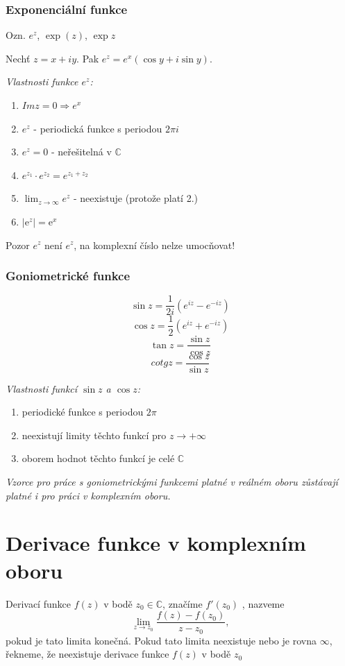 \subsubsection{Exponenciální funkce}
Ozn. $e^z$, $\exp(z)$, $\exp z$
\begin{definition}
Nechť $z=x+iy$. Pak $e^z=e^x(\cos y +i\sin y)$.
\end{definition}

\textit{Vlastnosti funkce $e^z$:} 
\begin{enumerate}
\item $Im z= 0 \Rightarrow e^x$
\item $e^z$ - periodická funkce s periodou $2\pi i$
\item $e^z=0$ - neřešitelná v $\mathbb{C}$
\item $e^{z_1}\cdot e^{z_2}=e^{z_1+z_2}$
\item $\lim_{z \to \infty}e^z$ - neexistuje (protože platí 2.)
\item $|\mathrm{e}^{z}|=\mathrm{e}^x$ 
\end{enumerate}

Pozor $e^z$ není $e^z$, na komplexní číslo nelze umocňovat!

\subsubsection{Goniometrické funkce}

$$\sin z = \frac{1}{2i}(e^{iz}-e^{-iz})$$
$$\cos z = \frac{1}{2}(e^{iz}+e^{-iz})$$
$$\tan z = \frac{\sin z}{\cos z}$$
$$cotg z = \frac{\cos z}{\sin z}$$

\textit{Vlastnosti funkcí $\sin z$ a $\cos z$:} 
\begin{enumerate}
\item periodické funkce s periodou $2\pi$
\item neexistují limity těchto funkcí pro $z\rightarrow +\infty$
\item oborem hodnot těchto funkcí je celé $\mathbb{C}$
\end{enumerate}

\textit{Vzorce pro práce s goniometrickými funkcemi platné v reálném oboru zůstávají platné i pro práci v komplexním oboru.}

\section{Derivace funkce v komplexním oboru} 

\begin{definition}
Derivací funkce $f(z)$ v bodě $z_0\in\mathbb{C}$, značíme $f'(z_0)$ , nazveme $$\lim_{z\to z_0}\frac{f(z)-f(z_0)}{z-z_0},$$pokud je tato limita konečná. Pokud tato limita neexistuje nebo je rovna $\infty$, řekneme, že neexistuje derivace funkce $f(z) $ v bodě $z_0$
\end{definition}

